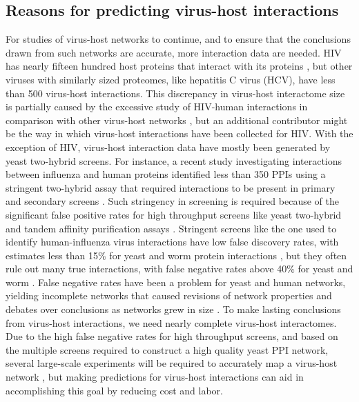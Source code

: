 
\subsection{Reasons for predicting virus-host interactions}

For studies of virus-host networks to continue, and to ensure that the
conclusions drawn from such networks are accurate, more interaction
data are needed. HIV has nearly fifteen hundred host proteins that
interact with its proteins \cite{fu09,ptak08}, but other viruses with
similarly sized proteomes, like hepatitis C virus (HCV), have less
than 500 virus-host interactions. This discrepancy in virus-host
interactome size is partially caused by the excessive study of
HIV-human interactions in comparison with other virus-host networks
\cite{mendez2010global}, but an additional contributor might be the
way in which virus-host interactions have been collected for HIV. With
the exception of HIV, virus-host interaction data have mostly been
generated by yeast two-hybrid screens. For instance, a recent study
investigating interactions between influenza and human proteins
identified less than 350 PPIs using a stringent two-hybrid assay that
required interactions to be present in primary and secondary screens
\cite{shapira2009physical}. Such stringency in screening is required
because of the significant false positive rates for high throughput
screens like yeast two-hybrid and tandem affinity purification assays
\cite{hart2006complete}. Stringent screens like the one used to
identify human-influenza virus interactions have low false discovery
rates, with estimates less than 15\% for yeast and worm protein
interactions \cite{huang2009precision}, but they often rule out many
true interactions, with false negative rates above 40\% for yeast and
worm \cite{huang2009precision}. False negative rates have been a
problem for yeast and human networks, yielding incomplete networks
that caused revisions of network properties and debates over
conclusions as networks grew in size \cite{batada06, batada07,
  agarwal09}. To make lasting conclusions from virus-host
interactions, we need nearly complete virus-host interactomes. Due to
the high false negative rates for high throughput screens, and based
on the multiple screens required to construct a high quality yeast PPI
network, several large-scale experiments will be required to
accurately map a virus-host network \cite{collins2007toward}, but
making predictions for virus-host interactions can aid in
accomplishing this goal by reducing cost and labor.

